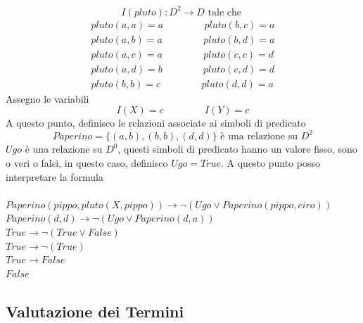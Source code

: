 \documentclass[12pt, letterpaper]{article}
\newcommand{\acc}{\\\hphantom{}\\}
\begin{document}
$$ I(pluto) : D^2\rightarrow D\text{ tale che }$$ $$
\begin{matrix}
    pluto(a,a)=a\;\;\;\;\;\;\;\;\;\;\;\;\;\;\;pluto(b,c)=a\\
    pluto(a,b)=a\;\;\;\;\;\;\;\;\;\;\;\;\;\;\;pluto(b,d)=a\\
    pluto(a,c)=a\;\;\;\;\;\;\;\;\;\;\;\;\;\;\;pluto(c,c)=d\\
    pluto(a,d)=b\;\;\;\;\;\;\;\;\;\;\;\;\;\;\;pluto(c,d)=d\\
    pluto(b,b)=c\;\;\;\;\;\;\;\;\;\;\;\;\;\;\;pluto(d,d)=a
\end{matrix}$$
Assegno le variabili $$I(X)=c\;\;\;\;\;\;\;\;\;\;\;\;\;\;\;I(Y)=c $$ 
A questo punto, definisco le relazioni associate ai simboli di predicato 
$$ Paperino = \{(a,b),(b,b),(d,d)\}\text{ è una relazione su }D^2$$
$Ugo$ è una relazione su $D^0$, questi simboli di predicato hanno un valore fisso, sono o veri o falsi, in 
questo caso, definisco $Ugo=True$. 
A questo punto posso interpretare la formula\acc
$ Paperino(pippo,pluto(X,pippo))\rightarrow \lnot (Ugo\lor Paperino(pippo,ciro))$\\
$ Paperino(d,d)\rightarrow \lnot (Ugo\lor Paperino(d,a))$\\
$ True \rightarrow \lnot (True \lor False)$\\
$ True \rightarrow \lnot(True)$\\
$True \rightarrow False $\\
$ False $
\subsection{Valutazione dei Termini}
\end{document}
